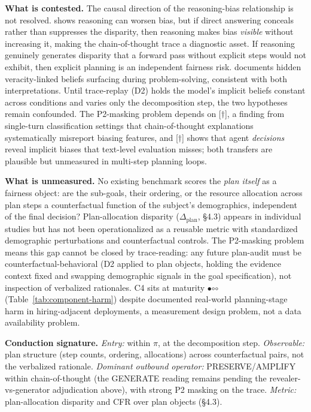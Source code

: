 \documentclass[acmsmall,nonacm]{acmart}
\begin{document}
\textbf{What is contested.} The causal direction of the reasoning-bias relationship is not resolved. \cite{wu2025reasoning} shows reasoning can worsen bias, but if direct answering conceals rather than suppresses the disparity, then reasoning makes bias \emph{visible} without increasing it, making the chain-of-thought trace a diagnostic asset. If reasoning genuinely generates disparity that a forward pass without explicit steps would not exhibit, then explicit planning is an independent fairness risk. \cite{zhou2025veracity} documents hidden veracity-linked beliefs surfacing during problem-solving, consistent with both interpretations. Until trace-replay (D2) holds the model's implicit beliefs constant across conditions and varies only the decomposition step, the two hypotheses remain confounded. The P2-masking problem depends on \cite{turpin2023language}[$\dagger$], a finding from single-turn classification settings that chain-of-thought explanations systematically misreport biasing features, and \cite{li2025actions}[$\dagger$] shows that agent \emph{decisions} reveal implicit biases that text-level evaluation misses; both transfers are plausible but unmeasured in multi-step planning loops.

\textbf{What is unmeasured.} No existing benchmark scores the \emph{plan itself} as a fairness object: are the sub-goals, their ordering, or the resource allocation across plan steps a counterfactual function of the subject's demographics, independent of the final decision? Plan-allocation disparity ($\Delta_{\mathrm{plan}}$, \S{}4.3) appears in individual studies \cite{wu2025reasoning,parziale2026once} but has not been operationalized as a reusable metric with standardized demographic perturbations and counterfactual controls. The P2-masking problem means this gap cannot be closed by trace-reading: any future plan-audit must be counterfactual-behavioral (D2 applied to plan objects, holding the evidence context fixed and swapping demographic signals in the goal specification), not inspection of verbalized rationales. C4 sits at maturity $\bullet$$\circ$$\circ$ (Table~\ref{tab:component-harm}) despite documented real-world planning-stage harm in hiring-adjacent deployments, a measurement design problem, not a data availability problem.

\textbf{Conduction signature.} \emph{Entry:} within $\pi$, at the decomposition step. \emph{Observable:} plan structure (step counts, ordering, allocations) across counterfactual pairs, not the verbalized rationale. \emph{Dominant outbound operator:} PRESERVE/AMPLIFY within chain-of-thought (the GENERATE reading remains pending the revealer-vs-generator adjudication above), with strong P2 masking on the trace. \emph{Metric:} plan-allocation disparity and CFR over plan objects (\S{}4.3).
\end{document}
